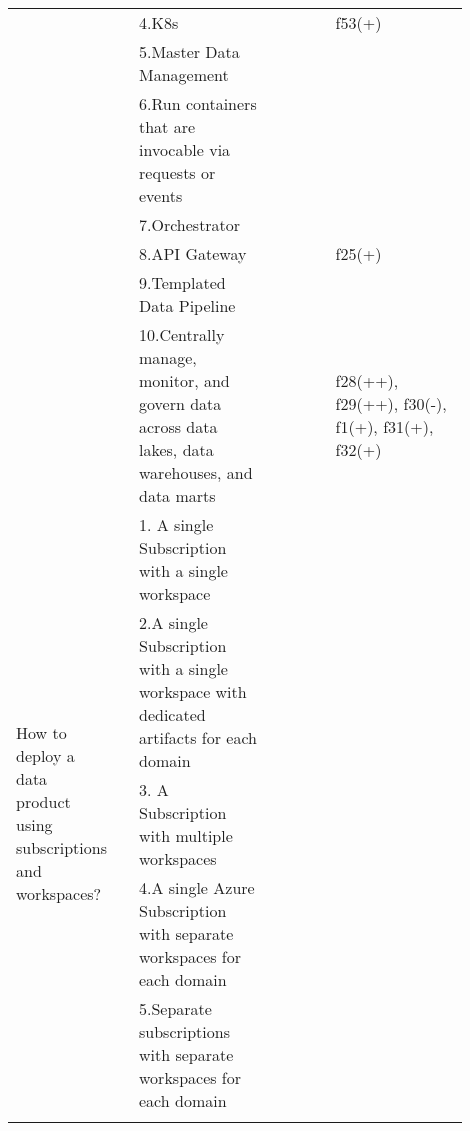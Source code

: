 \begin{tabular}{|p{0.12\linewidth}|p{0.015\linewidth}|p{0.3\linewidth}|p{0.15\linewidth}|p{0.31\linewidth}|}
 & \cellcolor{emerald_shape_5}{} & 4.K8s&\cellcolor{emerald_shape_4}{s6, s14, s32, s43, s45} & f53(+)\\
 & \cellcolor{emerald_shape_5}{} & 5.Master Data Management&\cellcolor{emerald_shape_3}{s7, s9, s23, s44} & \\
 & \cellcolor{emerald_shape_5}{} & 6.Run containers that are invocable via requests or events&\cellcolor{emerald_shape_4}{s14, s15, s30, s32, s33, s45} & \\
 & \cellcolor{emerald_shape_5}{} & 7.Orchestrator&\cellcolor{emerald_shape_3}{s9, s18, s30} & \\
 & \cellcolor{emerald_shape_5}{} & 8.API Gateway&\cellcolor{emerald_shape_1}{s20} & f25(+)\\
 & \cellcolor{emerald_shape_5}{} & 9.Templated Data Pipeline&\cellcolor{emerald_shape_2}{s30, s43} & \\
 & \multirow{-10}{\linewidth}{ \cellcolor{emerald_shape_5}{25}} &10.Centrally manage, monitor, and govern data across data lakes, data warehouses, and data marts&\cellcolor{emerald_shape_1}{s31} & f28(++), f29(++), f30(-), f1(+), f31(+), f32(+)\\
\multirow{5}{\linewidth}{How to deploy a data product using subscriptions and workspaces?} &\cellcolor{emerald_shape_2}{} &1. A single Subscription with a single workspace&\cellcolor{emerald_shape_4}{s36} & \\
 & \cellcolor{emerald_shape_2}{} & 2.A single Subscription with a single workspace with dedicated artifacts for each domain&\cellcolor{emerald_shape_4}{s36} & \\
 & \cellcolor{emerald_shape_2}{} & 3. A Subscription with multiple workspaces&\cellcolor{emerald_shape_4}{s36} & \\
 & \cellcolor{emerald_shape_2}{} & 4.A single Azure Subscription with separate workspaces for each domain&\cellcolor{emerald_shape_4}{s43} & \\
 & \multirow{-5}{\linewidth}{ \cellcolor{emerald_shape_2}{3}} &5.Separate subscriptions with separate workspaces for each domain&\cellcolor{emerald_shape_4}{s38} & \\
\hline
\multicolumn{5}{l}{\parbox{\textwidth}{\smallskip
}}
\end{tabular}
